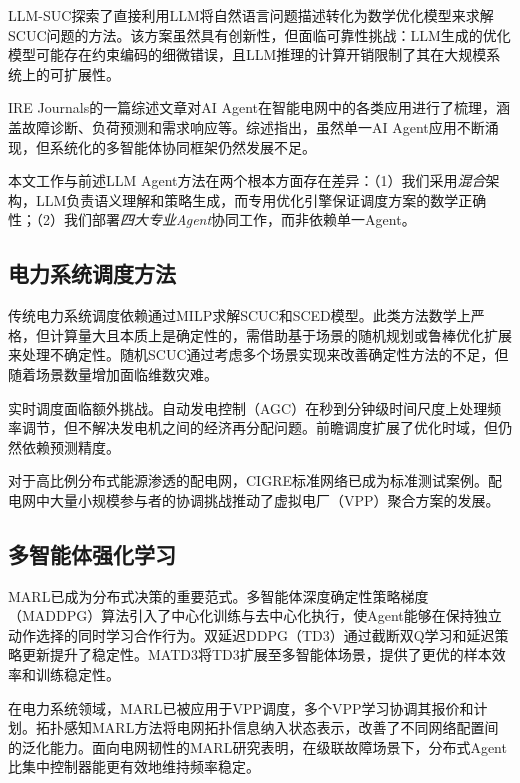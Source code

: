 \documentclass[conference]{IEEEtran}
\begin{document}
LLM-SUC\cite{llm_suc_2025}探索了直接利用LLM将自然语言问题描述转化为数学优化模型来求解SCUC问题的方法。该方案虽然具有创新性，但面临可靠性挑战：LLM生成的优化模型可能存在约束编码的细微错误，且LLM推理的计算开销限制了其在大规模系统上的可扩展性。

IRE Journals的一篇综述文章\cite{ire2025}对AI Agent在智能电网中的各类应用进行了梳理，涵盖故障诊断、负荷预测和需求响应等。综述指出，虽然单一AI Agent应用不断涌现，但系统化的多智能体协同框架仍然发展不足。

本文工作与前述LLM Agent方法在两个根本方面存在差异：（1）我们采用\textit{混合}架构，LLM负责语义理解和策略生成，而专用优化引擎保证调度方案的数学正确性；（2）我们部署\textit{四大专业Agent}协同工作，而非依赖单一Agent。

\subsection{电力系统调度方法}

传统电力系统调度依赖通过MILP求解SCUC和SCED模型\cite{wood_power}。此类方法数学上严格，但计算量大且本质上是确定性的，需借助基于场景的随机规划或鲁棒优化扩展来处理不确定性。随机SCUC\cite{stochastic_scuc}通过考虑多个场景实现来改善确定性方法的不足，但随着场景数量增加面临维数灾难。

实时调度面临额外挑战。自动发电控制（AGC）在秒到分钟级时间尺度上处理频率调节，但不解决发电机之间的经济再分配问题。前瞻调度扩展了优化时域，但仍然依赖预测精度。

对于高比例分布式能源渗透的配电网，CIGRE标准网络\cite{cigre_benchmark}已成为标准测试案例。配电网中大量小规模参与者的协调挑战推动了虚拟电厂（VPP）聚合方案的发展。

\subsection{多智能体强化学习}

MARL已成为分布式决策的重要范式。多智能体深度确定性策略梯度（MADDPG）算法\cite{maddpg}引入了中心化训练与去中心化执行，使Agent能够在保持独立动作选择的同时学习合作行为。双延迟DDPG（TD3）\cite{td3}通过截断双Q学习和延迟策略更新提升了稳定性。MATD3\cite{matd3}将TD3扩展至多智能体场景，提供了更优的样本效率和训练稳定性。

在电力系统领域，MARL已被应用于VPP调度\cite{madrl_vpp_2026}，多个VPP学习协调其报价和计划。拓扑感知MARL方法\cite{topology_marl_2026}将电网拓扑信息纳入状态表示，改善了不同网络配置间的泛化能力。面向电网韧性的MARL研究\cite{marl_grid_2026}表明，在级联故障场景下，分布式Agent比集中控制器能更有效地维持频率稳定。
\end{document}
